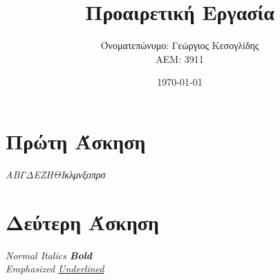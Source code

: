 \documentclass[a4paper,11pt]{article}
\title{Προαιρετική Εργασία}
\author{Όνοματεπώνυμο: Γεώργιος Κεσογλίδης  \\  ΑΕΜ: 3911}
\date{\today}
\newcommand{\lt}{\latintext}
\begin{document}
\maketitle

\vspace*{1 cm}
\section{Πρώτη Άσκηση}
\vspace*{1 cm}
	\begin{center} 
		\textit{\tiny{Α}\scriptsize{Β}\footnotesize{Γ}\small{Δ}\normalsize{Ε}\large{Ζ}\Large{Η}\LARGE{Θ}\huge{I}\huge{κ}\LARGE{λ}\Large{μ}\large{ν}\normalsize{ξ}\small{ο}\footnotesize{π}\scriptsize{ρ}\tiny{σ}}
	\end{center}

\vspace*{2 cm}
\section{Δεύτερη Άσκηση}
\vspace*{1 cm}
	\begin{center} 
		\textit{ \huge{\lt Normal Italics \textbf{Bold} \\ \emph{E}mphasized \textit{\underline{Underlined}}}}
	\end{center}

\vspace*{4 cm}
\end{document}
